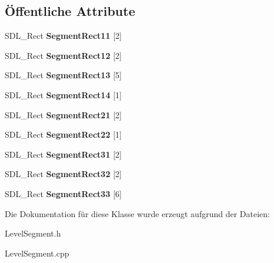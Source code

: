 \subsection*{Öffentliche Attribute}
\begin{DoxyCompactItemize}
\item 
\hypertarget{class_level_segmente_a5d1a94c5dbff9f1a21e7133d0a1df938}{S\-D\-L\-\_\-\-Rect {\bfseries Segment\-Rect11} \mbox{[}2\mbox{]}}\label{class_level_segmente_a5d1a94c5dbff9f1a21e7133d0a1df938}

\item 
\hypertarget{class_level_segmente_ae16269f7d452a929abbcb2fb069b1d22}{S\-D\-L\-\_\-\-Rect {\bfseries Segment\-Rect12} \mbox{[}2\mbox{]}}\label{class_level_segmente_ae16269f7d452a929abbcb2fb069b1d22}

\item 
\hypertarget{class_level_segmente_a4e3f5c52739fcde85e79adee6cd3e9c5}{S\-D\-L\-\_\-\-Rect {\bfseries Segment\-Rect13} \mbox{[}5\mbox{]}}\label{class_level_segmente_a4e3f5c52739fcde85e79adee6cd3e9c5}

\item 
\hypertarget{class_level_segmente_a56501807d8a912a8edad899585d17cf1}{S\-D\-L\-\_\-\-Rect {\bfseries Segment\-Rect14} \mbox{[}1\mbox{]}}\label{class_level_segmente_a56501807d8a912a8edad899585d17cf1}

\item 
\hypertarget{class_level_segmente_af1e8ec1f2beeaadad76cc31935166771}{S\-D\-L\-\_\-\-Rect {\bfseries Segment\-Rect21} \mbox{[}2\mbox{]}}\label{class_level_segmente_af1e8ec1f2beeaadad76cc31935166771}

\item 
\hypertarget{class_level_segmente_a5810a11bf901830c9c18e43fb5cf3a15}{S\-D\-L\-\_\-\-Rect {\bfseries Segment\-Rect22} \mbox{[}1\mbox{]}}\label{class_level_segmente_a5810a11bf901830c9c18e43fb5cf3a15}

\item 
\hypertarget{class_level_segmente_a7a75d1639d095443c70340bd9276e4b8}{S\-D\-L\-\_\-\-Rect {\bfseries Segment\-Rect31} \mbox{[}2\mbox{]}}\label{class_level_segmente_a7a75d1639d095443c70340bd9276e4b8}

\item 
\hypertarget{class_level_segmente_ada637a35cca601d073fe54a855d127f2}{S\-D\-L\-\_\-\-Rect {\bfseries Segment\-Rect32} \mbox{[}2\mbox{]}}\label{class_level_segmente_ada637a35cca601d073fe54a855d127f2}

\item 
\hypertarget{class_level_segmente_af52268cfa4490167a5cf9ce5ee1f60d2}{S\-D\-L\-\_\-\-Rect {\bfseries Segment\-Rect33} \mbox{[}6\mbox{]}}\label{class_level_segmente_af52268cfa4490167a5cf9ce5ee1f60d2}

\end{DoxyCompactItemize}


Die Dokumentation für diese Klasse wurde erzeugt aufgrund der Dateien\-:\begin{DoxyCompactItemize}
\item 
Level\-Segment.\-h\item 
Level\-Segment.\-cpp\end{DoxyCompactItemize}
